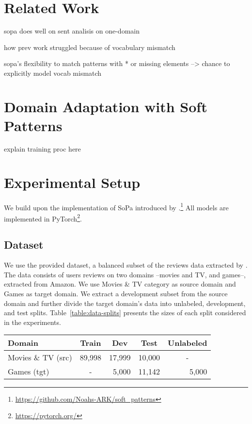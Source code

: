\documentclass[11pt,a4paper]{article}
\begin{document}


\section{Related Work}


sopa does well on sent analisis on one-domain

how prev work struggled because of vocabulary mismatch

sopa's flexibility to match patterns with * or missing elements
--> chance to explicitly model vocab mismatch



\section{Domain Adaptation with Soft Patterns}

explain training proc here


\section{Experimental Setup}

We build upon the implementation of SoPa introduced by \citet{schwartz2018sopa}.\footnote{\url{https://github.com/Noahs-ARK/soft_patterns}} All models are implemented in PyTorch\footnote{\url{https://pytorch.org/}}.

\subsection{Dataset}

We use the provided dataset, a balanced subset of the reviews data extracted by \citet{mcauley2015image}. The data consists of users reviews on two domains --movies and TV, and games--, extracted from Amazon.
We use Movies \& TV category as source domain and Games as target domain. We extract a development subset from the source domain and further divide the target domain's data into unlabeled, development, and test splits. Table~\ref{table:data-splits} presents the sizes of each split considered in the experiments.

\begin{table*}[]
\centering
\begin{tabular}{|l|c|r|r|c|}
\hline
Domain              & Train                       & \multicolumn{1}{c|}{Dev} & \multicolumn{1}{c|}{Test} & Unlabeled                  \\ \hline
Movies \& TV (src) & \multicolumn{1}{r|}{89,998} & 17,999                   & 10,000                    & -                          \\ \hline
Games (tgt)         & -                           & 5,000                    & 11,142                    & \multicolumn{1}{r|}{5,000} \\ \hline
\end{tabular}
\caption{Size of data splits in source (src) and target (tgt) domains.}
\label{table:data-splits}
\end{table*}
\end{document}
